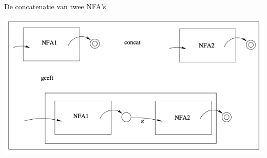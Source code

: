 \begin{pro}{De concatenatie van twee NFA's}
\begin{minipage}{.6\textwidth}
    \end{minipage}
    \hspace{-0.5cm}
    \begin{minipage}{.36\textwidth}
        \includegraphics[scale = 0.28]{Images/ConcatNFA}
    \end{minipage}
\end{pro}

